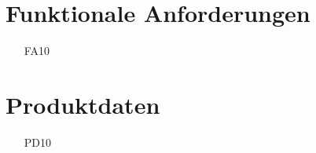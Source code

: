 \section{Funktionale Anforderungen}
\begin{itemize}[nosep]
	\item[FA10]
\end{itemize}

\section{Produktdaten}
\begin{itemize}[nosep]
	\item[PD10]
\end{itemize}